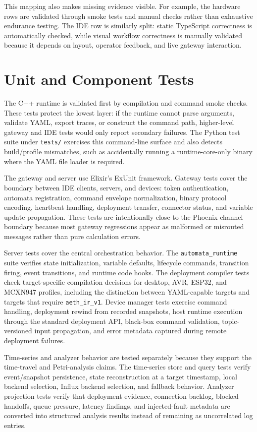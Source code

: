 This mapping also makes missing evidence visible. For example, the hardware rows are validated through smoke tests and manual checks rather than exhaustive endurance testing. The IDE row is similarly split: static TypeScript correctness is automatically checked, while visual workflow correctness is manually validated because it depends on layout, operator feedback, and live gateway interaction.

\section{Unit and Component Tests}

The C++ runtime is validated first by compilation and command smoke checks. These tests protect the lowest layer: if the runtime cannot parse arguments, validate YAML, export traces, or construct the command path, higher-level gateway and IDE tests would only report secondary failures. The Python test suite under \texttt{tests/} exercises this command-line surface and also detects build/profile mismatches, such as accidentally running a runtime-core-only binary where the YAML file loader is required.

The gateway and server use Elixir's ExUnit framework. Gateway tests cover the boundary between IDE clients, servers, and devices: token authentication, automata registration, command envelope normalization, binary protocol encoding, heartbeat handling, deployment transfer, connector status, and variable update propagation. These tests are intentionally close to the Phoenix channel boundary because most gateway regressions appear as malformed or misrouted messages rather than pure calculation errors.

Server tests cover the central orchestration behavior. The \texttt{automata\_runtime} suite verifies state initialization, variable defaults, lifecycle commands, transition firing, event transitions, and runtime code hooks. The deployment compiler tests check target-specific compilation decisions for desktop, AVR, ESP32, and MCXN947 profiles, including the distinction between YAML-capable targets and targets that require \texttt{aeth\_ir\_v1}. Device manager tests exercise command handling, deployment rewind from recorded snapshots, host runtime execution through the standard deployment API, black-box command validation, topic-versioned input propagation, and error metadata captured during remote deployment failures.

Time-series and analyzer behavior are tested separately because they support the time-travel and Petri-analysis claims. The time-series store and query tests verify event/snapshot persistence, state reconstruction at a target timestamp, local backend selection, Influx backend selection, and fallback behavior. Analyzer projection tests verify that deployment evidence, connection backlog, blocked handoffs, queue pressure, latency findings, and injected-fault metadata are converted into structured analysis results instead of remaining as uncorrelated log entries.

